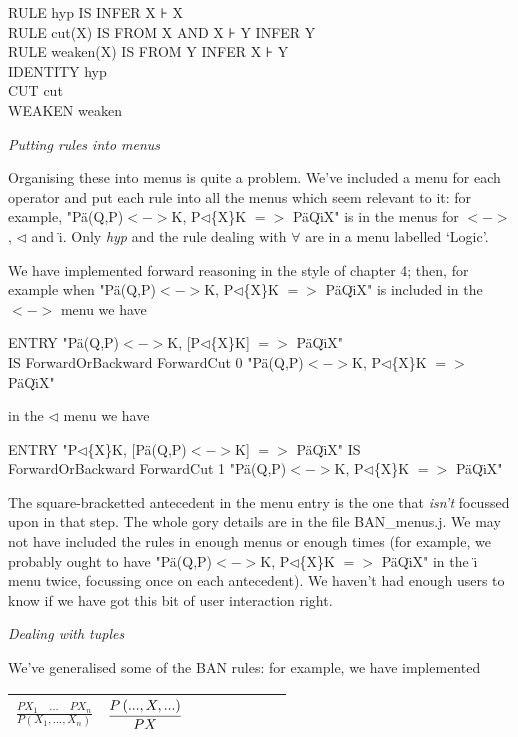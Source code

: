\documentclass[11pt]{book}
\newcommand{\tab}{\hspace{5mm}}
\begin{document}
RULE hyp IS INFER X ⊦ X\\
RULE cut(X) IS FROM X AND X ⊦ Y INFER Y\\
RULE weaken(X) IS FROM Y INFER X ⊦ Y\\
IDENTITY hyp\\
CUT cut\\
WEAKEN weaken


\textit{Putting rules into menus}


Organising these into menus is quite a problem. We've included a menu for each operator and put each rule into all the menus which seem relevant to it: for example, "P\"{a}(Q,P)$<->$K, P$\triangleleft$\{X\}K $=>$ P\"{a}Q\"{\i}X" is in the menus for $<->$, $\triangleleft$ and \"{\i}. Only \textit{hyp} and the rule dealing with \ensuremath{\forall} are in a menu labelled `Logic'.


We have implemented forward reasoning in the style of chapter 4; then, for example when "P\"{a}(Q,P)$<->$K, P$\triangleleft$\{X\}K $=>$ P\"{a}Q\"{\i}X" is included in the $<->$ menu we have

ENTRY "P\"{a}(Q,P)$<->$K, [P$\triangleleft$\{X\}K] $=>$ P\"{a}Q\"{\i}X"\\
\tab IS ForwardOrBackward ForwardCut 0 "P\"{a}(Q,P)$<->$K, P$\triangleleft$\{X\}K $=>$ P\"{a}Q\"{\i}X"


in the $\triangleleft$ menu we have

ENTRY "P$\triangleleft$\{X\}K, [P\"{a}(Q,P)$<->$K] $=>$ P\"{a}Q\"{\i}X" IS \\
\tab ForwardOrBackward ForwardCut 1 "P\"{a}(Q,P)$<->$K, P$\triangleleft$\{X\}K $=>$ P\"{a}Q\"{\i}X"


The square-bracketted antecedent in the menu entry is the one that \textit{isn't} focussed upon in that step. The whole gory details are in the file BAN\_menus.j. We may not have included the rules in enough menus or enough times (for example, we probably ought to have "P\"{a}(Q,P)$<->$K, P$\triangleleft$\{X\}K $=>$ P\"{a}Q\"{\i}X" in the \"{\i} menu twice, focussing once on each antecedent). We haven't had enough users to know if we have got this bit of user interaction right.


\textit{Dealing with tuples}


We've generalised some of the BAN rules: for example, we have implemented\\


\begin{tabular}{|p{1.082in}|p{1.082in}|p{1.082in}|p{1.082in}|p{0.043in}|p{0.043in}|p{0.043in}|p{0.043in}|} \hline
{\raggedright $\frac{PX_{1} \quad ...\quad PX_{n} }{P\left( X_{1},...,X_{n} \right) } $ } & {\raggedright $\infer{PX}
       {P\left( ...,X,...\right) }$ } & {\raggedright } & {\raggedright }\\
\hline \end{tabular}
\end{document}
